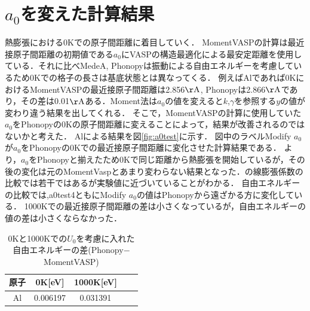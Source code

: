 \section{$a_0$を変えた計算結果}
熱膨張における0Kでの原子間距離に着目していく．
MomentVASPの計算は最近接原子間距離の初期値である$a_0$にVASPの構造最適化による最安定距離を使用している．それに比べMedeA, Phonopyは振動による自由エネルギーを考慮しているため0Kでの格子の長さは基底状態とは異なってくる．
例えばAlであれば0KにおけるMomentVASPの最近接原子間距離は2.856$\mathrm{\AA}$, Phonopyは2.866$\mathrm{\AA}$であり，その差は0.01$\mathrm{\AA}$ある．Moment法は$a_0$の値を変えると$k$,$\gamma$を参照する$y$の値が変わり違う結果を出してくれる．
そこで，MomentVASPの計算に使用していた$a_0$をPhonopyの0Kの原子間距離に変えることによって，結果が改善されるのではないかと考えた．
Alによる結果を図\ref{fig:a0test}に示す．
図中のラベルModify $a_0$が$a_0$をPhonopyの0Kでの最近接原子間距離に変化させた計算結果である．
より，$a_0$をPhonopyと揃えたため0Kで同じ距離から熱膨張を開始しているが，その後の変化は元のMomentVaspとあまり変わらない結果となった．の線膨張係数の比較では若干ではあるが実験値に近づいていることがわかる．
自由エネルギーの比較では,{a0test4}ともにModify $a_0$の値はPhonopyから遠ざかる方に変化している．
1000Kでの最近接原子間距離の差は小さくなっているが，自由エネルギーの値の差は小さくならなかった．
\begin{table}[htbp]
\caption{0Kと1000Kでの$U_0$を考慮に入れた自由エネルギーの差(Phonopy$-$MomentVASP)}
  \label{tb:free-diff3}
  \centering
  \begin{tabular}{ccccc}\hline
    原子 & 0K[eV] & 1000K[eV] \\ \hline \hline
    Al & 0.006197 & 0.031391 \\ \hline
  \end{tabular}
\end{table}

